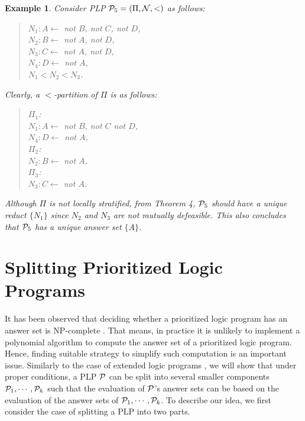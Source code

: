 \documentclass{tlp}
\newtheorem{example}{Example} %
\begin{document}
\begin{example}
Consider PLP ${\cal P}_{5}=(\Pi, {\cal N}, <)$ as follows:
\begin{quote}
$N_{1}: A\leftarrow$ {\em not} $B$, {\em not} $C$, {\em not} $D$,\\
\hspace*{.1in} $N_{2}: B\leftarrow$ {\em not} $A$, {\em not} $D$, \\
\hspace*{.1in} $N_{3}: C\leftarrow$ {\em not} $A$, {\em not} $D$,\\
\hspace*{.1in} $N_{4}: D\leftarrow$ {\em not} $A$,\\
\hspace*{.1in} $N_{1}<N_{2}<N_{3}$.
\end{quote}
Clearly, a $<$-partition of $\Pi$ is as follows:
\begin{quote}
$\Pi_{1}$:\\
\hspace*{.2in} $N_{1}: A\leftarrow$ {\em not} $B$, {\em not} $C$ {\em not} $D$,\\
\hspace*{.2in} $N_{4}: D\leftarrow$ {\em not} $A$,\\
\hspace*{.1in} $\Pi_{2}$:\\
\hspace*{.2in} $N_{2}: B\leftarrow$ {\em not} $A$, \\
\hspace*{.1in} $\Pi_{3}$:\\
\hspace*{.2in} $N_{3}: C\leftarrow$ {\em not} $A$.
\end{quote}
Although $\Pi$ is not locally stratified, from Theorem 4,
${\cal P}_{5}$ should have a unique reduct $\{N_{1}\}$ since 
$N_{2}$ and $N_{3}$ are not mutually defeasible. This also
concludes that ${\cal P}_{5}$ has a unique answer set $\{A\}$.
\end{example}


\section{Splitting Prioritized Logic Programs}


It has been observed that deciding whether a prioritized logic
program has an answer set is NP-complete \cite{yan:00lp}. That means,
in practice it is unlikely to implement a polynomial algorithm to compute
the answer set of
a prioritized logic program. Hence,
finding suitable strategy to simplify such computation is an important issue.
Similarly to the case of extended logic programs \cite{lt:lp94}, we will show that
under proper conditions, 
a PLP ${\cal P}$ can be split into several smaller components
${\cal P}_{1}, \cdots, {\cal P}_{k}$ such that the evaluation of ${\cal P}$'s
answer sets can be based on the evaluation of the answer sets of
${\cal P}_{1}, \cdots, {\cal P}_{k}$.
To describe our idea, we
first consider the case of splitting a PLP into two parts.
\end{document}
